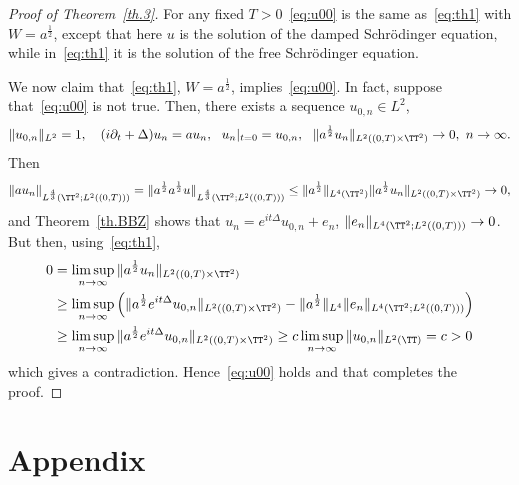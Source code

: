 \begin{proof}[Proof of Theorem~\ref{th.3}]
For any fixed $T>0$~\eqref{eq:u00} is the same as~\eqref{eq:th1} with $ W = a^{\frac12} $, except that here $u$ is the solution of the damped Schrödinger equation, while in~\eqref{eq:th1} it is the solution of the free Schrödinger equation.

We now claim that~\eqref{eq:th1}, $ W = a^{\frac12} $, implies~\eqref{eq:u00}. In fact, suppose that~\eqref{eq:u00} is not true. Then, there exists a sequence $ u_{0,n} \in L^2 $,
\[
\| u_{0,n} \|_{L^2} =1, \ \ \ (i \partial_t + \Delta)u_n = a u_n, \ \ u_n|_{t=0} = u_{0,n}, \ \
\| a^{\frac12} u_n \|_{ L^2 ((0, T) \times \TT^2) } \to 0, \ n\to \infty.
\]
Then
\[
\| a u_n \|_{ L^{\frac43} (\TT^2; L^2 ((0, T))) } =
\| a^{\frac12} a^{\frac12} u \|_{ L^{\frac43} (\TT^2; L^2 ((0, T))) }
\leq \| a^{\frac12} \|_{L^4(\TT^2) }
\| a^{\frac12} u_n \|_{ L^2 ((0, T) \times \TT^2) } \to 0,
\]
and Theorem~\ref{th.BBZ} shows that $ u_n = e^{ it \Delta} u_{0,n} + e_n$, $ \| e_n \|_{ L^4 (\TT^2 ; L^2 ((0, T))) } \to 0 $. But then, using~\eqref{eq:th1},
\[
\begin{split} 0 & = \limsup_{n \to \infty } \| a^{\frac12} u_n \|_{L^2 ((0, T) \times \TT^2) }
\\ &
\geq \limsup_{n \to \infty } \left(\| a^{\frac12} e^{ it \Delta } u_{ 0,n} \|_{ L^2 ((0, T) \times \TT^2) } - \| a^{\frac12} \|_{L^4 }
\| e_n \|_{ L^4 (\TT^2 ; L^2 ((0, T))) } \right) \\
& \geq
\limsup_{n \to \infty } \| a^{\frac12} e^{ it \Delta } u_{ 0,n} \|_{ L^2 ((0, T) \times \TT^2) } \geq c
\limsup_{n\to \infty } \| u_{0,n}\|_{L^2 (\TT)} = c > 0
\end{split}
\]
which gives a contradiction. Hence~\eqref{eq:u00} holds and that completes the proof.
\end{proof}

\appendix
\section*{Appendix}


